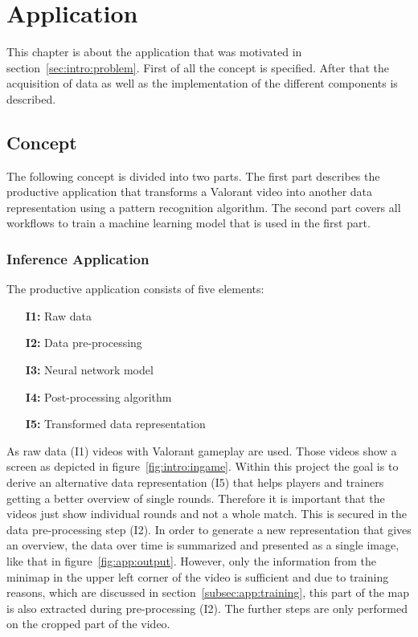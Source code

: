\chapter{Application}\label{chpt:application}
\glsresetall

This chapter is about the application that was motivated in section~\ref{sec:intro:problem}. First of 
all the concept is specified. After that the acquisition of data as well as the implementation of the 
different components is described.

\section{Concept}\label{sec:app:concept}

The following concept is divided into two parts. The first part describes the productive application 
that transforms a Valorant video into another data representation using a pattern recognition 
algorithm. The second part covers all workflows to train a machine learning model that is used in the 
first part.

\subsection{Inference Application}\label{subsec:app:inference}

The productive application consists of five elements:

\begin{itemize}
	\item[\textbf{I1:}] Raw data
	\item[\textbf{I2:}] Data pre-processing
	\item[\textbf{I3:}] Neural network model
	\item[\textbf{I4:}] Post-processing algorithm
	\item[\textbf{I5:}] Transformed data representation
\end{itemize}

As raw data (I1) videos with Valorant gameplay are used. Those videos show a screen as depicted in 
figure~\ref{fig:intro:ingame}. Within this project the goal is to derive an alternative data 
representation (I5) that helps players and trainers getting a better overview of single rounds. 
Therefore it is important that the videos just show individual rounds and not a whole match. This is 
secured in the data pre-processing step (I2). In order to generate a new representation that gives an 
overview, the data over time is summarized and presented as a single image, like that in 
figure~\ref{fig:app:output}. However, only the information from the minimap in the upper left corner 
of the video is sufficient and due to training reasons, which are discussed in 
section~\ref{subsec:app:training}, this part of the map is also extracted during pre-processing (I2). 
The further steps are only performed on the cropped part of the video.


